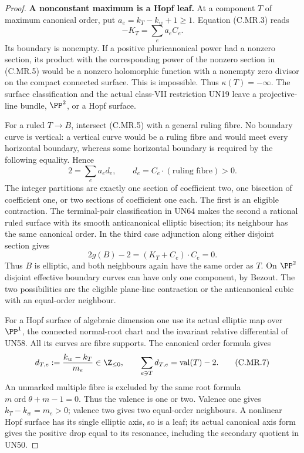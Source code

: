 \begin{proof}
\par\medskip\noindent\textbf{A nonconstant maximum is a Hopf leaf.}
At a component $T$ of maximum canonical order, put
$a_e=k_T-k_w+1\ge1$. Equation (C.MR.3) reads
\[
                         -K_T=\sum_e a_eC_e.
\tag{C.MR.5}
\]
Its boundary is nonempty. If a positive pluricanonical
power had a nonzero section, its product with the
corresponding power of the nonzero section in (C.MR.5)
would be a nonzero holomorphic function with a nonempty
zero divisor on the compact connected surface. This is
impossible. Thus $\kappa(T)=-\infty$. The surface
classification and the actual class-VII restriction UN19
leave a projective-line bundle, $\PP^2$, or a Hopf
surface.

For a ruled $T\to B$, intersect (C.MR.5) with a general
ruling fibre. No boundary curve is vertical: a vertical
curve would be a ruling fibre and would meet every
horizontal boundary, whereas some horizontal boundary
is required by the following equality. Hence
\[
              2=\sum_e a_ed_e,\qquad
              d_e=C_e\cdot(\text{ruling fibre})>0.
\tag{C.MR.6}
\]
The integer partitions are exactly one section of
coefficient two, one bisection of coefficient one,
or two sections of coefficient one each. The first
is an eligible contraction. The terminal-pair
classification in UN64 makes the second a rational
ruled surface with its smooth anticanonical elliptic
bisection; its neighbour has the same canonical order.
In the third case adjunction along either disjoint
section gives
\[
       2g(B)-2=(K_T+C_e)\cdot C_e=0.
\]
Thus $B$ is elliptic, and both neighbours again have
the same order as $T$. On $\PP^2$ disjoint effective
boundary curves can have only one component, by
Bezout. The two possibilities are the eligible
plane-line contraction or the anticanonical cubic
with an equal-order neighbour.

For a Hopf surface of algebraic dimension one use
its actual elliptic map over $\PP^1$, the connected
normal-root chart and the invariant relative
differential of UN58. All its curves are fibre
supports. The canonical order formula gives
\[
 d_{T,e}:=\frac{k_w-k_T}{m_e}\in\Z_{\le0},
 \qquad
              \sum_{e\ni T}d_{T,e}
                                  =\operatorname{val}(T)-2.
\tag{C.MR.7}
\]
An unmarked multiple fibre is excluded by the same
root formula $m\operatorname{ord}\theta+m-1=0$.
Thus the valence is one or two. Valence one gives
$k_T-k_w=m_e>0$; valence two gives two equal-order
neighbours. A nonlinear Hopf surface has its single
elliptic axis, so is a leaf; its actual canonical
axis form gives the positive drop equal to its
resonance, including the secondary quotient in UN50.


\end{proof}
